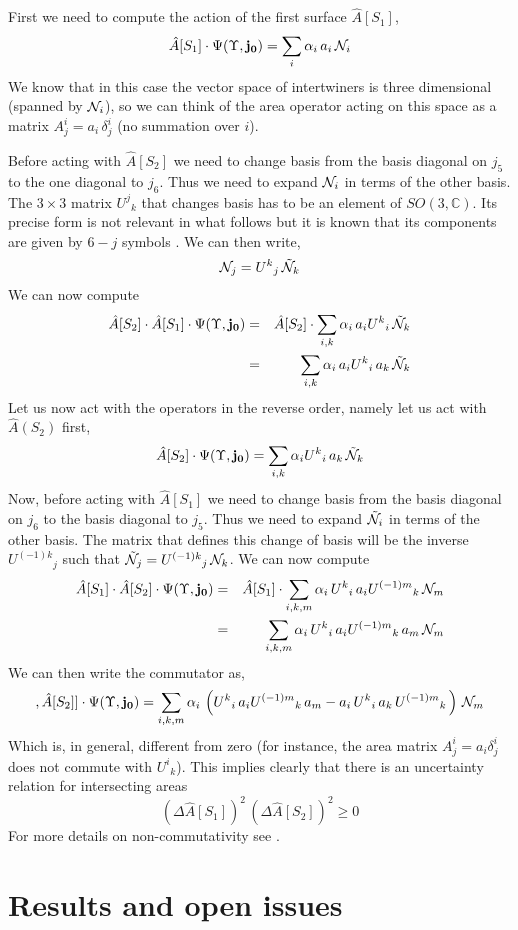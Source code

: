 \documentclass[aps,prd,tightenlines,showpacs,nofootinbib,preprint]{revtex4}
\def\ba{\begin{eqnarray}}
\def\ea{\end{eqnarray}}
\def\be{\begin{equation}}
\def\ee{\end{equation}}
\begin{document}
First we need to compute the action of the first surface
$\hat{A}[S_1]$,
%
\be \hat{A}[S_1]\cdot {\Psi}(\Upsilon,{\bf
j_0})=\sum_i\a_i\,a_i\,{\cal N}_i \ee We know that in this case
the vector space of intertwiners is three dimensional (spanned by
${\cal N}_i$), so we can think of the area operator acting on this
space as a matrix $A^i_j=a_i\,\delta^i_j$ (no summation over $i$).

Before acting with $\hat{A}[S_2]$ we need to change basis from the
basis diagonal on $j_5$ to the one diagonal to $j_6$. Thus we need
to expand ${\cal N}_i$ in terms of the other basis. The $3 \times
3$ matrix ${U^j}_k$ that changes basis has to be an element of
$SO(3,\mathbb{C})$. Its precise form is not relevant in what
follows but it is known that its components are given by $6-j$
symbols \cite{Rovelli:2004tv}. We can then write, \be {\cal
N}_j={U^k}_j\,\tilde{\cal N}_k \ee We can now compute
 \ba
 \hat{A}[S_2]\cdot \hat{A}[S_1]\cdot
{\Psi}(\Upsilon,{\bf j_0}) &=&  \hat{A}[S_2]\cdot\sum_{i,k}
\a_i\,a_i {U^k}_i\,\tilde{\cal N}_k \\
&=& \sum_{i,k} \a_i\,a_i {U^k}_i\,a_k\,\tilde{\cal N}_k \ea
%
Let us now act with the operators in the reverse order, namely let
us act with $\hat{A}(S_2)$ first,
 \be
 \hat{A}[S_2]\cdot{\Psi}(\Upsilon,{\bf j_0})=\sum_{i,k}\a_i{U^k}_i\,a_k
 \,\tilde{\cal N}_k
\ee Now, before acting with $\hat{A}[S_1]$ we need to change basis
from the basis diagonal on $j_6$ to the basis diagonal to $j_5$.
Thus we need to expand $\tilde{\cal N}_i$ in terms of the other
basis. The matrix that defines this change of basis will be the
inverse ${U^{(-1)k}}_j$ such that $\tilde{\cal
N}_j={U^{(-1)k}}_j\,{\cal N}_k $. We can now compute
 \ba
 \hat{A}[S_1]\cdot \hat{A}[S_2]\cdot
{\Psi}(\Upsilon,{\bf j_0}) &=&  \hat{A}[S_1]\cdot\sum_{i,k,m}
\a_i\, {U^k}_i\,a_i  {U^{(-1)m}}_k\,{\cal N}_m  \\
&=& \sum_{i,k,m} \a_i\, {U^k}_i\,a_i{U^{(-1)m}}_k\,a_m\,{\cal N}_m
\ea We can then write the commutator as,
%
\be [\hat{A}[S_1], \hat{A}[S_2]]\cdot{\Psi}(\Upsilon,{\bf j_0}) =
\sum_{i,k,m} \a_i\, \left({U^k}_i\,a_i{U^{(-1)m}}_k\,a_m- a_i\,
{U^k}_i\,a_k\,{U^{(-1)m}}_k\,\right)\,{\cal N}_m \ee
%
Which is, in general, different from zero (for instance, the area
matrix $A^{i}_{j}=a_i\delta^i_j$ does not commute with ${U^i}_k$).
This implies clearly that there is an uncertainty relation for
intersecting areas
$$(\Delta \hat{A}[S_1])^2\,(\Delta \hat{A}[S_2])^2\geq 0$$
For more details on non-commutativity see \cite{non-comm}.

\section{Results and open issues}
\label{sec:6}
\end{document}
